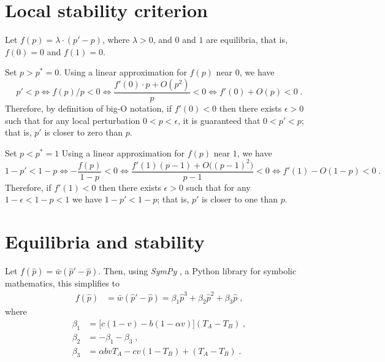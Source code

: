 \documentclass[12pt]{extarticle}
\begin{document}
\begin{appendices}
\renewcommand{\theequation}{\thesection\arabic{equation}}


\section{Local stability criterion} \label{sec:appendixA}

Let $f(p)=\lambda \cdot (p'-p)$, where $\lambda>0$, and $0$ and $1$ are equilibria, that is, $f(0)=0$ and $f(1)=0$.

Set $p>p^*=0$.
Using a linear approximation for $f(p)$ near $0$, we have
\begin{equation}
p' < p \Leftrightarrow 
f(p)/p < 0 \Leftrightarrow 
\frac{f'(0) \cdot p + O(p^2)}{p} < 0 \Leftrightarrow 
f'(0) + O(p) < 0 \;.
\end{equation}
Therefore, by definition of big-O notation, if $f'(0)<0$ then there exists $\epsilon>0$ such that for any local perturbation $0<p<\epsilon$, it is guaranteed that $0<p'<p$; that is, $p'$ is closer to zero than $p$.

Set $p<p^*=1$
Using a linear approximation for $f(p)$ near $1$, we have
\begin{equation}
1-p' < 1-p  \Leftrightarrow 
-\frac{f(p)}{1-p} < 0 \Leftrightarrow 
\frac{f'(1)(p-1) + O\big((p-1)^2\big)}{p-1} < 0 \Leftrightarrow 
f'(1) - O(1-p) < 0 \;.
\end{equation}
Therefore, if $f'(1)<0$ then there exists $\epsilon>0$ such that for any $1-\epsilon<1-p<1$ we have $1-p'<1-p$; that is, $p'$ is closer to one than $p$.


\section{Equilibria and stability} \label{sec:appendixB}

Let $f(\hat{p}) = \bar{w}(\hat{p}' - \hat{p})$.
Then, using \emph{SymPy} \citep{Meurer2017}, a Python library for symbolic mathematics, this simplifies to
\begin{equation} \label{eq:general_case_polynomial}
\begin{aligned}
  f(\hat{p}) &= \bar{w}(\hat{p}'-\hat{p}) =
  \beta_1 \hat{p}^3 + \beta_2 \hat{p}^2 + \beta_3 \hat{p} \;,
\end{aligned}
\end{equation}
where 
\begin{equation} \label{eq:polynomial_coefficients}
\begin{aligned}
  \beta_1 &= \big[c(1-v) - b (1-\alpha v)\big] (T_A-T_B) \;, \\
  \beta_2 &= -\beta_1 -\beta_3 \;, \\
  \beta_3 &= \alpha bvT_A - cv(1-T_B) + (T_A-T_B) \;.
\end{aligned}
\end{equation}


\end{appendices}
\end{document}
